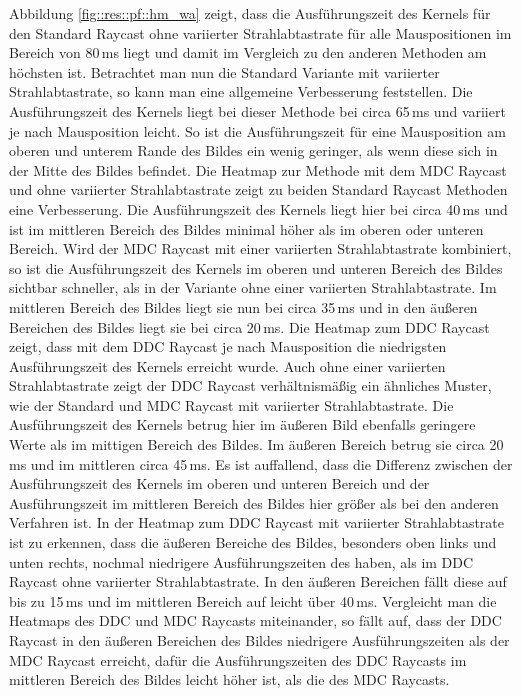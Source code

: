 Abbildung \ref{fig::res::pf::hm_wa} zeigt, dass die Ausführungszeit des Kernels für den Standard Raycast ohne variierter Strahlabtastrate für alle Mauspositionen im Bereich von 80\,ms liegt und damit im Vergleich zu den anderen Methoden am höchsten ist.
Betrachtet man nun die Standard Variante mit variierter Strahlabtastrate, so kann man eine allgemeine Verbesserung feststellen.
Die Ausführungszeit des Kernels liegt bei dieser Methode bei circa 65\,ms und variiert je nach Mausposition leicht.
So ist die Ausführungszeit für eine Mausposition am oberen und unterem Rande des Bildes ein wenig geringer, als wenn diese sich in der Mitte des Bildes befindet.
Die Heatmap zur Methode mit dem MDC Raycast und ohne variierter Strahlabtastrate zeigt zu beiden Standard Raycast Methoden eine Verbesserung.
Die Ausführungszeit des Kernels liegt hier bei circa 40\,ms und ist im mittleren Bereich des Bildes minimal höher als im oberen oder unteren Bereich.
Wird der MDC Raycast mit einer variierten Strahlabtastrate kombiniert, so ist die Ausführungszeit des Kernels im oberen und unteren Bereich des Bildes sichtbar schneller, als in der Variante ohne einer variierten Strahlabtastrate.
Im mittleren Bereich des Bildes liegt sie nun bei circa 35\,ms und in den äußeren Bereichen des Bildes liegt sie bei circa 20\,ms.
Die Heatmap zum DDC Raycast zeigt, dass mit dem DDC Raycast je nach Mausposition die niedrigsten Ausführungszeit des Kernels erreicht wurde.
Auch ohne einer variierten Strahlabtastrate zeigt der DDC Raycast verhältnismäßig ein ähnliches Muster, wie der Standard und MDC Raycast mit variierter Strahlabtastrate.
Die Ausführungszeit des Kernels betrug hier im äußeren Bild ebenfalls geringere Werte als im mittigen Bereich des Bildes.
Im äußeren Bereich betrug sie circa 20\,ms und im mittleren circa 45\,ms.
Es ist auffallend, dass die Differenz zwischen der Ausführungszeit des Kernels im oberen und unteren Bereich und der Ausführungszeit im mittleren Bereich des Bildes hier größer als bei den anderen Verfahren ist.
In der Heatmap zum DDC Raycast mit variierter Strahlabtastrate ist zu erkennen, dass die äußeren Bereiche des Bildes, besonders oben links und unten rechts, nochmal niedrigere Ausführungszeiten des haben, als im DDC Raycast ohne variierter Strahlabtastrate.
In den äußeren Bereichen fällt diese auf bis zu 15\,ms und im mittleren Bereich auf leicht über 40\,ms.
Vergleicht man die Heatmaps des DDC und MDC Raycasts miteinander, so fällt auf, dass der DDC Raycast in den äußeren Bereichen des Bildes niedrigere Ausführungszeiten als der MDC Raycast erreicht, dafür die Ausführungszeiten des DDC Raycasts im mittleren Bereich des Bildes leicht höher ist, als die des MDC Raycasts.

